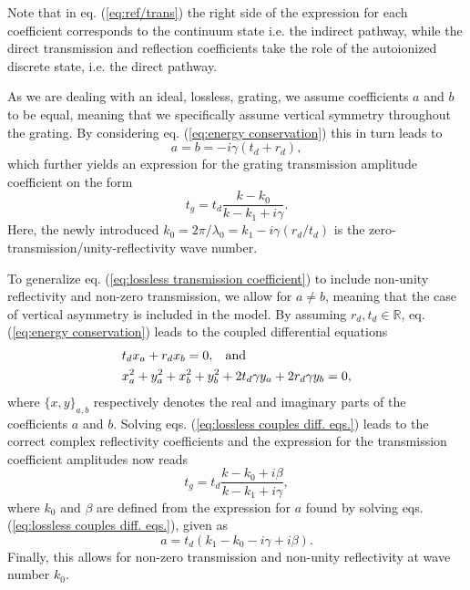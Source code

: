 Note that in eq. (\ref{eq:ref/trans}) the right side of the expression for each coefficient corresponds to the continuum state i.e. the indirect pathway, while the direct transmission and reflection coefficients take the role of the autoionized discrete state, i.e. the direct pathway\cite{Fano-theory}.

As we are dealing with an ideal, lossless, grating, we assume coefficients $a$ and $b$ to be equal, meaning that we specifically assume vertical symmetry throughout the grating. By considering eq. (\ref{eq:energy conservation}) this in turn leads to 
\begin{equation}
    a = b = -i \gamma (t_d + r_d),
\end{equation}
which further yields an expression for the grating transmission amplitude coefficient on the form
\begin{equation}
    t_g = t_d \frac{k - k_0}{k - k_1 + i \gamma}.
    \label{eq:lossless transmission coefficient}
\end{equation}
Here, the newly introduced $k_0 = 2\pi/\lambda_0 = k_1 -i \gamma (r_d/t_d)$ is the zero-transmission/unity-reflectivity wave number.

To generalize eq. (\ref{eq:lossless transmission coefficient}) to include non-unity reflectivity and non-zero transmission, we allow for $a \neq b$\cite{Bykov,Darki2,Parthenopoulos}, meaning that the case of vertical asymmetry is included in the model\cite{Popov}. By assuming $r_d,t_d \in \mathbb{R}$, eq. (\ref{eq:energy conservation}) leads to the coupled differential equations
\begin{equation}
    \begin{split}
        &t_d x_a + r_d x_b = 0, \hspace{0.3cm} \text{and} \\
        &x_a^2 + y_a^2 + x_b^2 + y_b^2 + 2 t_d \gamma y_a + 2 r_d \gamma y_b = 0,
    \end{split}
    \label{eq:lossless couples diff. eqs.}
\end{equation}
where $\{x,y\}_{a,b}$ respectively denotes the real and imaginary parts of the coefficients $a$ and $b$. Solving eqs. (\ref{eq:lossless couples diff. eqs.}) leads to the correct complex reflectivity coefficients and the expression for the transmission coefficient amplitudes now reads
\begin{equation}
    t_g = t_d \frac{k - k_0 + i \beta}{k - k_1 + i \gamma},
    \label{eq:transmission_coefficients_non_zero_values}
\end{equation}
where $k_0$ and $\beta$ are defined from the expression for $a$ found by solving eqs. (\ref{eq:lossless couples diff. eqs.}), given as
\begin{equation}
    a = t_d (k_1 - k_0 - i \gamma + i \beta).
\end{equation}
Finally, this allows for non-zero transmission and non-unity reflectivity at wave number $k_0$.

